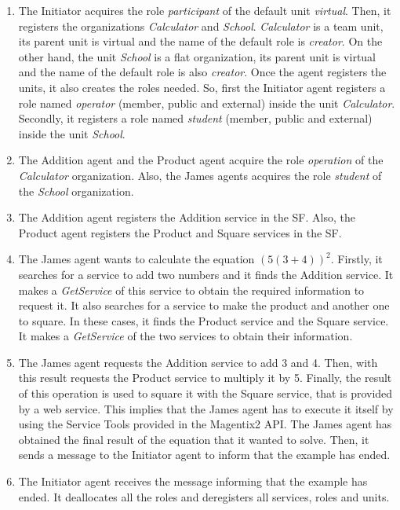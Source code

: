 \begin{enumerate}
 \item The Initiator acquires the role \textit{participant} of the default unit \textit{virtual}. Then, it registers the organizations \textit{Calculator} and \textit{School}. \textit{Calculator} is a team unit, its parent unit is virtual and the name of the default role is \textit{creator}. On the other hand, the unit \textit{School} is a flat organization, its parent unit is virtual and the name of the default role is also \textit{creator}. Once the agent registers the units, it also creates the roles needed. So, first the Initiator agent registers a role named \textit{operator} (member, public and external) inside the unit \textit{Calculator}. Secondly, it registers a role named \textit{student} (member, public and external) inside the unit \textit{School}.

 \item The Addition agent and the Product agent acquire the role \textit{operation} of the \textit{Calculator} organization. Also, the James agents acquires the role \textit{student} of the \textit{School} organization.

 \item The Addition agent registers the Addition service in the SF. Also, the Product agent registers the Product and Square services in the SF.

 \item The James agent wants to calculate the equation $(5 (3 + 4))^2$. Firstly, it searches for a service to add two numbers and it finds the Addition service. It makes a \textit{GetService} of this service to obtain the required information to request it. It also searches for a service to make the product and another one to square. In these cases, it finds the Product service and the Square service. It makes a \textit{GetService} of the two services to obtain their information. 

 \item The James agent requests the Addition service to add 3 and 4. Then, with this result requests the Product service to multiply it by 5. Finally, the result of this operation is used to square it with the Square service, that is provided by a web service. This implies that the James agent has to execute it itself by using the Service Tools provided in the Magentix2 API. The James agent has obtained the final result of the equation that it wanted to solve. Then, it sends a message to the Initiator agent to inform that the example has ended.

 \item The Initiator agent receives the message informing that the example has ended. It deallocates all the roles and deregisters all services, roles and units.

\end{enumerate}

